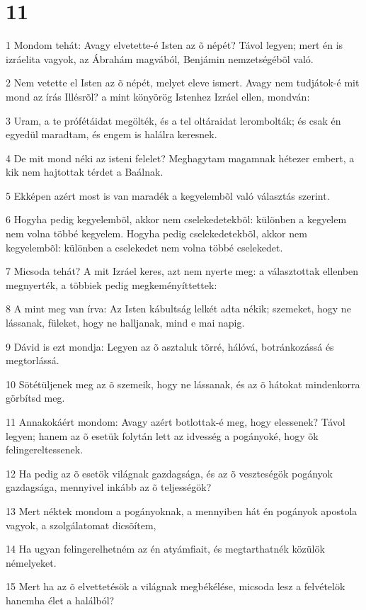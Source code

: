 \chapter{11}

\par 1 Mondom tehát: Avagy elvetette-é Isten az õ népét? Távol legyen; mert én is izráelita vagyok, az Ábrahám magvából, Benjámin nemzetségébõl való.
\par 2 Nem vetette el Isten az õ népét, melyet eleve ismert. Avagy nem tudjátok-é mit mond az írás Illésrõl? a mint könyörög Istenhez Izráel ellen, mondván:
\par 3 Uram, a te prófétáidat megölték, és a tel oltáraidat lerombolták; és csak én egyedül maradtam, és engem is halálra keresnek.
\par 4 De mit mond néki az isteni felelet? Meghagytam magamnak hétezer embert, a kik nem hajtottak térdet a Baálnak.
\par 5 Ekképen azért most is van maradék a kegyelembõl való választás szerint.
\par 6 Hogyha pedig kegyelembõl, akkor nem cselekedetekbõl: különben a kegyelem nem volna többé kegyelem. Hogyha pedig cselekedetekbõl, akkor nem kegyelembõl: különben a cselekedet nem volna többé cselekedet.
\par 7 Micsoda tehát? A mit Izráel keres, azt nem nyerte meg: a választottak ellenben megnyerték, a többiek pedig megkeményíttettek:
\par 8 A mint meg van írva: Az Isten kábultság lelkét adta nékik; szemeket, hogy ne lássanak, füleket, hogy ne halljanak, mind e mai napig.
\par 9 Dávid is ezt mondja: Legyen az õ asztaluk tõrré, hálóvá, botránkozássá és megtorlássá.
\par 10 Sötétüljenek meg az õ szemeik, hogy ne lássanak, és az õ hátokat mindenkorra görbítsd meg.
\par 11 Annakokáért mondom: Avagy azért botlottak-é meg, hogy elessenek? Távol legyen; hanem az õ esetük folytán lett az idvesség a pogányoké, hogy  õk felingereltessenek.
\par 12 Ha pedig az õ esetök világnak gazdagsága, és az õ veszteségök pogányok gazdagsága, mennyivel inkább az õ teljességök?
\par 13 Mert néktek mondom a pogányoknak, a mennyiben hát én pogányok apostola vagyok, a szolgálatomat dicsõítem,
\par 14 Ha ugyan felingerelhetném az én atyámfiait, és megtarthatnék közülök némelyeket.
\par 15 Mert ha az õ elvettetésök a világnak megbékélése, micsoda lesz a felvételök hanemha élet a halálból?
